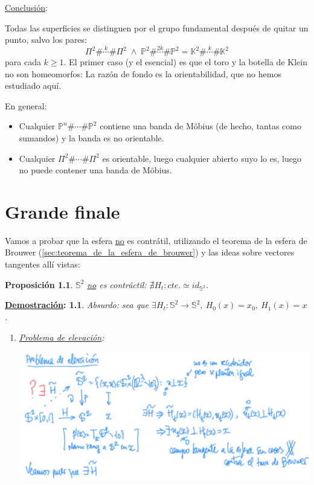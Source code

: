 \documentclass[10pt,a4paper,openright]{book}
\theoremstyle{break}
\newtheorem*{prop}{Proposición}
\newtheorem*{demo}{\underline{Demostración}:}
\begin{document}
\underline{Conclusión}:

Todas las superficies se distinguen por el grupo fundamental después de quitar un punto, salvo los pares:
\[
\Pi^2 \# \stackrel{k}{\cdots} \# \Pi^2\; \land \;\mathbb{P}^{2} \# \stackrel{2k}{\cdots} \# \mathbb{P}^{2} = \mathbb{K}^2 \# \stackrel{k}{\cdots} \# \mathbb{K}^2
\]
para cada $k \ge 1$. El primer caso (y el esencial) es que el toro y la botella de Klein no son homeomorfos: La razón de fondo es la orientabilidad, que no hemos estudiado aquí.

En general:
\begin{itemize}
    \item Cualquier $\mathbb{P}^{n} \# \cdots \# \mathbb{P}^{2}$ contiene una banda de Möbius (de hecho, tantas como sumandos) y la banda es no orientable.
    \item Cualquier $\Pi^2 \# \cdots \# \Pi^2$ es orientable, luego cualquier abierto suyo lo es, luego no puede contener una banda de Möbius.
\end{itemize}


\chapter{Grande finale}%
\label{cha:grande_finale}
Vamos a probar que la esfera \underline{no} es contrátil, utilizando el teorema de la esfera de Brouwer (\ref{sec:teorema_de_la_esfera_de_brouwer}) y las ideas sobre vectores tangentes allí vistas:
\begin{prop}
$\mathbb{S}^{2}$ \underline{no} es contráctil: $\nexists H_t: cte. \simeq id_{\mathbb{S}^{2}}$.
\end{prop}
\begin{demo}
Absurdo: sea que $\exists H_t: \mathbb{S}^{2} \rightarrow \mathbb{S}^{2},\ H_0\left( x \right) = x_0,\ H_1\left( x \right) = x$.
\begin{enumerate}
    \item \underline{Problema de elevación}:
    \begin{center}
        \includegraphics[scale=0.3]{images/prob_elevacion} 
    \end{center}
\end{enumerate}
\end{demo}
\end{document}
